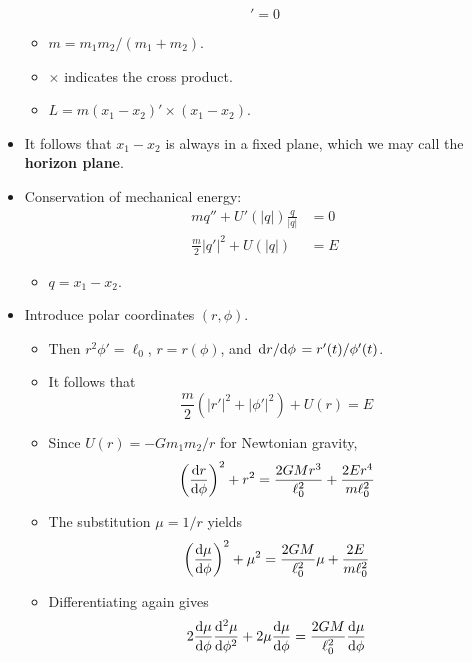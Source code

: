 \documentclass[../notes.tex]{subfiles}
\begin{document}
\begin{itemize}
    \begin{equation*}
        [m(x_1-x_2)'\times(x_1-x_2)]' = 0
    \end{equation*}
    \begin{itemize}
        \item $m=m_1m_2/(m_1+m_2)$.
        \item $\times$ indicates the cross product.
        \item $L=m(x_1-x_2)'\times(x_1-x_2)$.
    \end{itemize}
    \item It follows that $x_1-x_2$ is always in a fixed plane, which we may call the \textbf{horizon plane}.
    \item Conservation of mechanical energy:
    \begin{align*}
        mq''+U'(|q|)\frac{q}{|q|} &= 0\\
        \frac{m}{2}|q'|^2+U(|q|) &= E
    \end{align*}
    \begin{itemize}
        \item $q=x_1-x_2$.
    \end{itemize}
    \item Introduce polar coordinates $(r,\phi)$.
    \begin{itemize}
        \item Then $r^2\phi'=\ell_0$, $r=r(\phi)$, and $\dv*{r}{\phi}=r'(t)/\phi'(t)$.
        \item It follows that
        \begin{equation*}
            \frac{m}{2}(|r'|^2+|\phi'|^2)+U(r) = E
        \end{equation*}
        \item Since $U(r)=-Gm_1m_2/r$ for Newtonian gravity,
        \begin{equation*}
            \left( \dv{r}{\phi} \right)^2+r^2 = \frac{2GMr^3}{\ell_0^2}+\frac{2Er^4}{m\ell_0^2}
        \end{equation*}
        \item The substitution $\mu=1/r$ yields
        \begin{equation*}
            \left( \dv{\mu}{\phi} \right)^2+\mu^2 = \frac{2GM}{\ell_0^2}\mu+\frac{2E}{m\ell_0^2}
        \end{equation*}
        \item Differentiating again gives
        \begin{equation*}
            2\dv{\mu}{\phi}\dv[2]{\mu}{\phi}+2\mu\dv{\mu}{\phi} = \frac{2GM}{\ell_0^2}\dv{\mu}{\phi}

\end{equation*}
\end{itemize}
\end{itemize}
\end{document}
